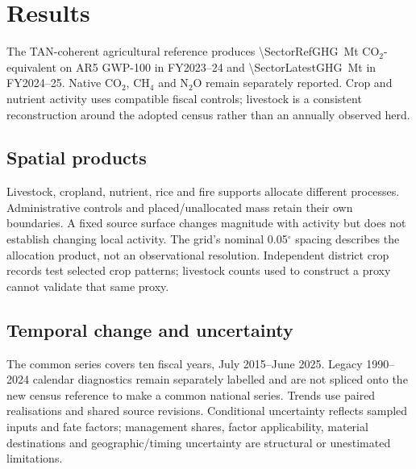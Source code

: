 \section{Results}
\label{sec:results}
The TAN-coherent agricultural reference produces \SI{\SectorRefGHG}{\mega\tonne} CO$_2$-equivalent on AR5 GWP-100 in FY2023--24 and \SI{\SectorLatestGHG}{\mega\tonne} in FY2024--25. Native CO$_2$, CH$_4$ and N$_2$O remain separately reported. Crop and nutrient activity uses compatible fiscal controls; livestock is a consistent reconstruction around the adopted census rather than an annually observed herd.

\begin{table}[htbp]\centering\small

\caption{Current agricultural source-category totals under S\_TAN, generated from the native annual records.}\label{tab:national}
\end{table}

\subsection{Spatial products}\label{sec:results-proxies}\label{sec:results-district}\label{sec:results-districtyear}
Livestock, cropland, nutrient, rice and fire supports allocate different processes. Administrative controls and placed/unallocated mass retain their own boundaries. A fixed source surface changes magnitude with activity but does not establish changing local activity. The grid's nominal 0.05$^\circ$ spacing describes the allocation product, not an observational resolution. Independent district crop records test selected crop patterns; livestock counts used to construct a proxy cannot validate that same proxy.

\subsection{Temporal change and uncertainty}
The common series covers ten fiscal years, July 2015--June 2025. Legacy 1990--2024 calendar diagnostics remain separately labelled and are not spliced onto the new census reference to make a common national series. Trends use paired realisations and shared source revisions. Conditional uncertainty reflects sampled inputs and fate factors; management shares, factor applicability, material destinations and geographic/timing uncertainty are structural or unestimated limitations.

